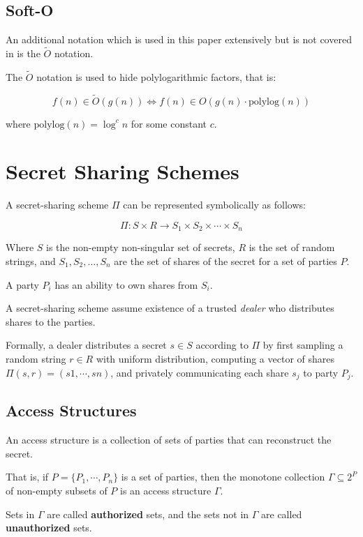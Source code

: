 \subsection{Soft-O}

An additional notation which is used in this paper extensively but is not covered in \cite{cormen2009introduction} is the $\tilde{O}$ notation.

The $\tilde{O}$ notation is used to hide polylogarithmic factors, that is:

\[
    f(n) \in \tilde{O}(g(n)) \Longleftrightarrow f(n) \in O(g(n) \cdot \text{polylog}(n))
\]

where $\text{polylog}(n) = \log^c n$ for some constant $c$.

\section{Secret Sharing Schemes}

A secret-sharing scheme $\Pi$ can be represented symbolically as follows:

\[
    \Pi: S \times R \rightarrow S_1 \times S_2 \times \cdots \times S_n
\]

Where $S$ is the non-empty non-singular set of secrets, $R$ is the set of random strings, and $S_1, S_2, \ldots, S_n$ are the set of shares of the secret for a set of parties $P$.

A party $P_i$ has an ability to own shares from $S_i$.

A secret-sharing scheme assume existence of a trusted \textit{dealer} who distributes shares to the parties.

Formally, a dealer distributes a secret $s \in S$
according to $\Pi$ by first sampling a random string $r \in R$ with uniform distribution,
computing a vector of shares $\Pi(s, r) = (s1, \cdots , sn)$, and privately communicating
each share $s_j$ to party $P_j$.

\subsection{Access Structures}

An access structure is a collection of sets of parties that can reconstruct the secret.

That is, if $P = \{P_1, \cdots, P_n\}$ is a set of parties, then the monotone collection $\Gamma \subseteq 2^P$ of non-empty subsets of $P$ is an access structure $\Gamma$.

Sets in $\Gamma$ are called \textbf{authorized} sets, and the sets not in $\Gamma$ are called \textbf{unauthorized} sets.

